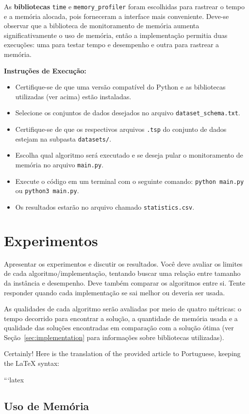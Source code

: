 As \textbf{bibliotecas} \texttt{time} e \texttt{memory\_profiler} foram escolhidas para rastrear o tempo 
e a memória alocada, pois forneceram a interface mais conveniente. Deve-se observar que a biblioteca 
de monitoramento de memória aumenta significativamente o uso de memória, então a implementação permitia 
duas execuções: uma para testar tempo e desempenho e outra para rastrear a memória.

\textbf{Instruções de Execução:}
\begin{itemize}
  \item Certifique-se de que uma versão compatível do Python e as bibliotecas utilizadas (ver acima) estão instaladas.
  \item Selecione os conjuntos de dados desejados no arquivo \texttt{dataset\_schema.txt}.
  \item Certifique-se de que os respectivos arquivos \texttt{.tsp} do conjunto de dados estejam na subpasta \texttt{datasets/}.
  \item Escolha qual algoritmo será executado e se deseja pular o monitoramento de memória no arquivo \texttt{main.py}.
  \item Execute o código em um terminal com o seguinte comando: \texttt{python main.py} ou \texttt{python3 main.py}.
  \item Os resultados estarão no arquivo chamado \texttt{statistics.csv}.
\end{itemize}

\section{Experimentos} \label{sec:experiments}
    Apresentar os experimentos e discutir os resultados. Você deve avaliar os
    limites de cada algoritmo/implementação, tentando buscar uma relação entre
    tamanho da instância e desempenho. Deve também comparar os algoritmos
    entre si. Tente responder quando cada implementação se sai melhor ou
    deveria ser usada.

As qualidades de cada algoritmo serão avaliadas por meio de quatro métricas: o tempo decorrido 
para encontrar a solução, a quantidade de memória usada e a qualidade das soluções encontradas 
em comparação com a solução ótima (ver Seção~\ref{sec:implementation} para informações 
sobre bibliotecas utilizadas).

Certainly! Here is the translation of the provided article to Portuguese, keeping the LaTeX syntax:

```latex
\subsection{Uso de Memória} \label{sec:exp_memory}

